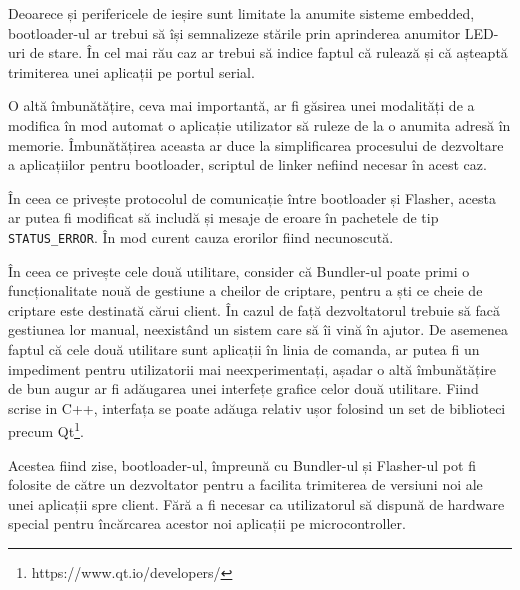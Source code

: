 \documentclass[12pt,a4paper,titlepage]{report}
\begin{document}
Deoarece și perifericele de ieșire sunt limitate la anumite sisteme embedded, bootloader-ul ar trebui să își semnalizeze stările prin aprinderea anumitor LED-uri de stare. În cel mai rău caz ar trebui să indice faptul că rulează și că așteaptă trimiterea unei aplicații pe portul serial.

O altă îmbunătățire, ceva mai importantă, ar fi găsirea unei modalități de a modifica în mod automat o aplicație utilizator să ruleze de la o anumita adresă în memorie. Îmbunătățirea aceasta ar duce la simplificarea procesului de dezvoltare a aplicațiilor pentru bootloader, scriptul de linker nefiind necesar în acest caz.

În ceea ce privește protocolul de comunicație între bootloader și Flasher, acesta ar putea fi modificat să includă și mesaje de eroare în pachetele de tip \texttt{STATUS\_ERROR}. În mod curent cauza erorilor fiind necunoscută.

În ceea ce privește cele două utilitare, consider că Bundler-ul poate primi o funcționalitate nouă de gestiune a cheilor de criptare, pentru a ști ce cheie de criptare este destinată cărui client. În cazul de față dezvoltatorul trebuie să facă gestiunea lor manual, neexistând un sistem care să îi vină în ajutor. De asemenea faptul că cele două utilitare sunt aplicații în linia de comanda, ar putea fi un impediment pentru utilizatorii mai neexperimentați, așadar o altă îmbunătățire de bun augur ar fi adăugarea unei interfețe grafice celor două utilitare. Fiind scrise in C++, interfața se poate adăuga relativ ușor folosind un set de biblioteci precum Qt\footnote{https://www.qt.io/developers/}.

Acestea fiind zise, bootloader-ul, împreună cu Bundler-ul și Flasher-ul pot fi folosite de către un dezvoltator pentru a facilita trimiterea de versiuni noi ale unei aplicații spre client. Fără a fi necesar ca utilizatorul să dispună de hardware special pentru încărcarea acestor noi aplicații pe microcontroller.


\newpage


\end{document}

